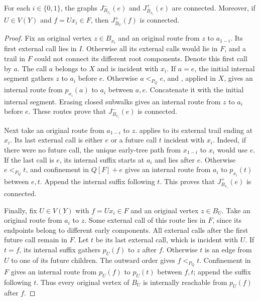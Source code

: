 \documentclass[USenglish, a4paper, thm-restate,numberwithinsect, cleveref]{lipics-v2021}
\begin{document}
\begin{lemma}
\label{lem:characterization-internal-threshold-connectivity}
For each $i\in\{0,1\}$, the graphs
$J_{B_{x_i}}^-(e)$ and $J_{B_{x_i}}^+(e)$ are connected.
Moreover, if $U\in V(Y)$ and $f=Ux_i\in F$, then $J_{B_U}^+(f)$
is connected.
\end{lemma}
\begin{proof}
Fix an original vertex $z\in B_{x_i}$ and an original route from
$z$ to $a_{1-i}$. Its first external call lies in $I$. Otherwise
all its external calls would lie in $F$, and a trail in $F$ could
not connect its different root components. Denote this first call
by $a$. The call $a$ belongs to $X$ and is incident with $x_i$.
If $a=e$, the initial internal segment gathers $z$ to $a_i$ before
$e$. Otherwise $a<_{P_Q}e$, and
, applied in $X$, gives an internal
route from $p_{x_i}(a)$ to $a_i$ between $a,e$. Concatenate it with
the initial internal segment. Erasing closed subwalks gives an
internal route from $z$ to $a_i$ before $e$. These routes prove that
$J_{B_{x_i}}^-(e)$ is connected.

Next take an original route from $a_{1-i}$ to $z$.
 applies to its external trail ending
at $x_i$. Its last external call is either $e$ or a future call $t$
incident with $x_i$. Indeed, if there were no future call, the unique
early-tree path from $x_{1-i}$ to $x_i$ would use $e$.
If the last call is $e$, its internal suffix starts at $a_i$ and
lies after $e$. Otherwise $e<_{P_Q}t$, and confinement in $Q[F]+e$
gives an internal route from $a_i$ to $p_{x_i}(t)$ between $e,t$.
Append the internal suffix following $t$. This proves that
$J_{B_{x_i}}^+(e)$ is connected.

Finally, fix $U\in V(Y)$ with $f=Ux_i\in F$ and an original
vertex $z\in B_U$. Take an original route from $a_i$ to $z$.
Some external call of this route lies in $F$, since its endpoints
belong to different early components. All external calls after the
first future call remain in $F$. Let $t$ be its last external call,
which is incident with $U$. If $t=f$, its internal suffix gathers
$p_U(f)$ to $z$ after $f$. Otherwise $t$ is an edge from $U$ to one
of its future children. The outward order gives $f<_{P_Q}t$.
Confinement in $F$ gives an internal route from $p_U(f)$ to $p_U(t)$
between $f,t$; append the suffix following $t$. Thus every original
vertex of $B_U$ is internally reachable from $p_U(f)$ after $f$.
\end{proof}
\end{document}
